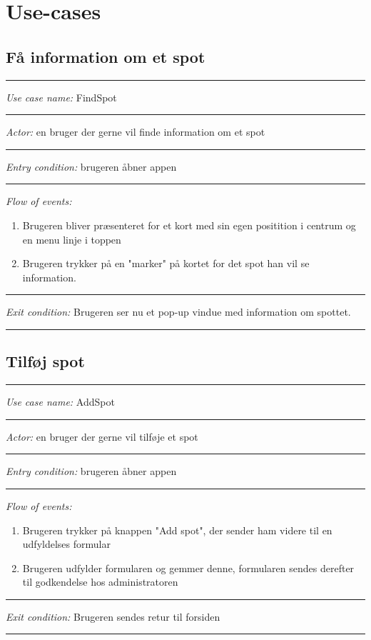 \documentclass[12pt]{article}
\begin{document}
\section*{Use-cases}
\subsection*{Få information om et spot}
\hrule\vspace{5mm}
\textit{Use case name:} FindSpot\\
\hrule\vspace{5mm}
\textit{Actor:} en bruger der gerne vil finde information om et spot\\
\hrule\vspace{5mm}
\textit{Entry condition:} brugeren åbner appen\\
\hrule\vspace{5mm}
\textit{Flow of events:}
\begin{enumerate}
\item Brugeren bliver præsenteret for et kort med sin egen positition i centrum og en menu linje i toppen
\item Brugeren trykker på en "marker" på kortet for det spot han vil se information.
\end{enumerate}
\hrule\vspace{5mm}
\textit{Exit condition:} Brugeren ser nu et pop-up vindue med information om spottet.\\
\hrule\vspace{5mm}
\newpage
\subsection*{Tilføj spot}
\hrule\vspace{5mm}
\textit{Use case name:} AddSpot\\
\hrule\vspace{5mm}
\textit{Actor:} en bruger der gerne vil tilføje et spot\\
\hrule\vspace{5mm}
\textit{Entry condition:} brugeren åbner appen\\
\hrule\vspace{5mm}
\textit{Flow of events:}
\begin{enumerate}
\item Brugeren trykker på knappen "Add spot", der sender ham videre til en udfyldelses formular
\item Brugeren udfylder formularen og gemmer denne, formularen sendes derefter til godkendelse hos administratoren
\end{enumerate}
\hrule\vspace{5mm}
\textit{Exit condition:} Brugeren sendes retur til forsiden\\
\hrule\vspace{5mm}
\newpage
\end{document}

